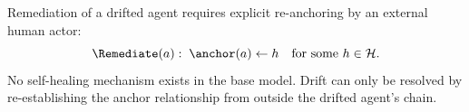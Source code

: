 \begin{property}
Remediation of a drifted agent requires explicit re-anchoring by an external human actor:
\begin{equation}
\Remediate(a):\; \anchor(a) \leftarrow h \quad \text{for some } h \in \mathcal{H}.
\end{equation}
No self-healing mechanism exists in the base model. Drift can only be resolved by re-establishing the anchor relationship from outside the drifted agent's chain.
\end{property}
